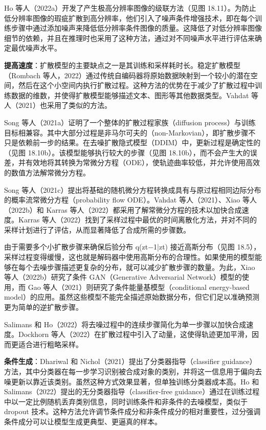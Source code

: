 \documentclass[lang=cn,newtx,10pt,scheme=chinese]{elegantbook}
\begin{document}
Ho 等人（2022a）开发了产生极高分辨率图像的级联方法（见图 18.11）。为防止低分辨率图像的瑕疵扩散到高分辨率，他们引入了噪声条件增强技术，即在每个训练步骤中通过添加噪声来降低低分辨率条件图像的质量。这降低了对低分辨率图像细节的依赖，并且在推理时也采用了这种方法，通过对不同噪声水平进行评估来确定最优噪声水平。

\textbf{提高速度}：扩散模型的主要缺点之一是其训练和采样耗时长。稳定扩散模型（Rombach 等人，2022）通过传统自编码器将原始数据映射到一个较小的潜在空间，然后在这个小空间内执行扩散过程。这种方法的优势在于减少了扩散过程中训练数据的维数，并使得扩散模型能够描述文本、图形等其他数据类型。Vahdat 等人（2021）也采用了类似的方法。

Song 等人（2021a）证明了一个整体的扩散过程家族（diffusion process）与训练目标相兼容。其中大部分过程是非马尔可夫的（non-Markovian），即扩散步骤不只是依赖前一步的结果。在去噪扩散隐式模型（DDIM）中，更新过程是确定性的（见图 18.10b）。该模型能够执行较大的步骤（见图 18.10b），而不会产生大的误差，并有效地将其转换为常微分方程（ODE），使轨迹曲率较低，并允许使用高效的数值方法解常微分方程。

Song 等人（2021c）提出将基础的随机微分方程转换成具有与原过程相同边际分布的概率流常微分方程（probability flow ODE）。Vahdat 等人（2021）、Xiao 等人（2022b）和 Karras 等人（2022）都采用了解常微分方程的技术以加快合成速度。Karras 等人（2022）找到了采样过程中最优的时间离散化方法，并对不同的采样计划进行了评估，从而显著降低了合成所需的步骤数。

由于需要多个小扩散步骤来确保后验分布 q(zt−1|zt) 接近高斯分布（见图 18.5），采样过程变得缓慢，这也就是解码器中使用高斯分布的合理性。如果使用的模型能够在每个去噪步骤描述更复杂的分布，就可以减少扩散步骤的数量。为此，Xiao 等人（2022b）研究了条件 GAN（Generative Adversarial Network）模型的使用，而 Gao 等人（2021）则研究了条件能量基模型（conditional energy-based model）的应用。虽然这些模型不能完全描述原始数据分布，但它们足以准确预测更为简单的逆扩散步骤。

Salimans 和 Ho（2022）将去噪过程中的连续步骤简化为单一步骤以加快合成速度。Dockhorn 等人（2022）在扩散过程中引入了动量，这使得轨迹更加平滑，因而更适合进行粗略采样。

\textbf{条件生成}：Dhariwal 和 Nichol（2021）提出了分类器指导（classifier guidance）方法，其中分类器在每一步学习识别被合成对象的类别，并将这一信息用于偏向去噪更新以靠近该类别。虽然这种方式效果显著，但单独训练分类器成本高。Ho 和 Salimans（2022）提出的无分类器指导（classifier-free guidance）通过在训练过程中以一定比例随机丢弃类别信息，同时训练条件和非条件的去噪模型，类似于 dropout 技术。这种方法允许调节条件成分和非条件成分的相对重要性，过分强调条件成分可以让模型生成更典型、更逼真的样本。
\end{document}
